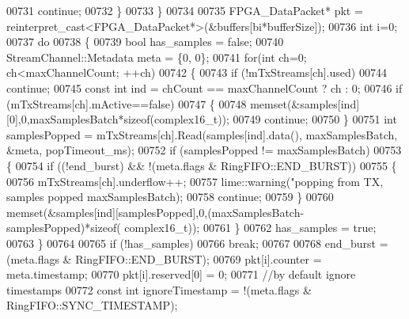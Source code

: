 \begin{DoxyCode}
00731                 \textcolor{keywordflow}{continue};
00732             \}
00733         \}
00734 
00735         FPGA_DataPacket* pkt = \textcolor{keyword}{reinterpret\_cast<}FPGA_DataPacket*\textcolor{keyword}{>}(&buffers[bi*bufferSize]);
00736         \textcolor{keywordtype}{int} i=0;
00737         \textcolor{keywordflow}{do}
00738         \{
00739             \textcolor{keywordtype}{bool} has\_samples = \textcolor{keyword}{false};
00740             StreamChannel::Metadata meta = \{0, 0\};
00741             \textcolor{keywordflow}{for}(\textcolor{keywordtype}{int} ch=0; ch<maxChannelCount; ++ch)
00742             \{
00743                 \textcolor{keywordflow}{if} (!mTxStreams[ch].used)
00744                     \textcolor{keywordflow}{continue};
00745                 \textcolor{keyword}{const} \textcolor{keywordtype}{int} ind = chCount == maxChannelCount ? ch : 0;
00746                 \textcolor{keywordflow}{if} (mTxStreams[ch].mActive==\textcolor{keyword}{false})
00747                 \{
00748                     memset(&samples[ind][0],0,maxSamplesBatch*\textcolor{keyword}{sizeof}(complex16_t));
00749                     \textcolor{keywordflow}{continue};
00750                 \}
00751                 \textcolor{keywordtype}{int} samplesPopped = mTxStreams[ch].Read(samples[ind].data(), maxSamplesBatch, &meta, 
      popTimeout\_ms);
00752                 \textcolor{keywordflow}{if} (samplesPopped != maxSamplesBatch)
00753                 \{
00754                     \textcolor{keywordflow}{if} ((!end\_burst) && !(meta.flags & RingFIFO::END_BURST))
00755                     \{
00756                         mTxStreams[ch].underflow++;
00757                         lime::warning(\textcolor{stringliteral}{"popping from TX, samples popped %
      maxSamplesBatch);
00758                         \textcolor{keywordflow}{continue};
00759                     \}
00760                     memset(&samples[ind][samplesPopped],0,(maxSamplesBatch-samplesPopped)*\textcolor{keyword}{sizeof}(
      complex16_t));
00761                 \}
00762                 has\_samples = \textcolor{keyword}{true};
00763             \}
00764 
00765             \textcolor{keywordflow}{if} (!has\_samples)
00766                 \textcolor{keywordflow}{break};
00767 
00768             end\_burst = (meta.flags & RingFIFO::END_BURST);
00769             pkt[i].counter = meta.timestamp;
00770             pkt[i].reserved[0] = 0;
00771             \textcolor{comment}{//by default ignore timestamps}
00772             \textcolor{keyword}{const} \textcolor{keywordtype}{int} ignoreTimestamp = !(meta.flags & RingFIFO::SYNC_TIMESTAMP);
}
\end{DoxyCode}
